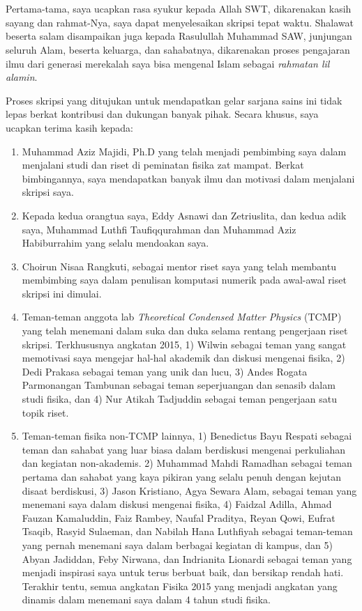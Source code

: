 \chapter*{\kataPengantar}
Pertama-tama, saya ucapkan rasa syukur kepada Allah SWT, dikarenakan kasih sayang dan rahmat-Nya, saya dapat menyelesaikan skripsi tepat waktu. Shalawat beserta salam disampaikan juga kepada Rasulullah Muhammad SAW, junjungan seluruh Alam, beserta keluarga, dan sahabatnya, dikarenakan proses pengajaran ilmu dari generasi merekalah saya bisa mengenal Islam sebagai \textit{rahmatan lil alamin}. 

Proses skripsi yang ditujukan untuk mendapatkan gelar sarjana sains ini tidak lepas berkat kontribusi dan dukungan banyak pihak. Secara khusus, saya ucapkan terima kasih kepada:
\begin{enumerate}
	\item Muhammad Aziz Majidi, Ph.D yang telah menjadi pembimbing saya dalam menjalani
	studi dan riset di peminatan fisika zat mampat. Berkat bimbingannya, saya mendapatkan
	banyak ilmu dan motivasi dalam menjalani skripsi saya.
	\item Kepada kedua orangtua saya, Eddy Asnawi dan Zetriuslita, dan kedua adik saya, Muhammad Luthfi 
	Taufiqqurahman dan Muhammad Aziz Habiburrahim yang selalu mendoakan saya.
	\item Choirun Nisaa Rangkuti, sebagai mentor riset saya yang telah membantu membimbing saya
	dalam penulisan komputasi numerik pada awal-awal riset skripsi ini dimulai. 
	\item Teman-teman anggota lab \textit{Theoretical Condensed Matter Physics} (TCMP) yang telah
	menemani dalam suka dan duka selama rentang pengerjaan riset skripsi. Terkhususnya angkatan 2015, 
	1) Wilwin sebagai teman yang sangat memotivasi saya mengejar hal-hal akademik dan diskusi mengenai fisika,
	2) Dedi Prakasa sebagai teman yang unik dan lucu, 3) Andes Rogata Parmonangan Tambunan sebagai teman seperjuangan dan senasib
	dalam studi fisika, dan 4) Nur Atikah Tadjuddin sebagai teman pengerjaan satu topik riset.
	\item Teman-teman fisika non-TCMP lainnya, 1) Benedictus Bayu Respati sebagai teman dan sahabat yang luar biasa
	dalam berdiskusi mengenai perkuliahan dan kegiatan non-akademis.	2) Muhammad Mahdi Ramadhan sebagai teman pertama dan sahabat yang kaya pikiran yang selalu penuh dengan kejutan disaat berdiskusi, 3) Jason Kristiano, Agya Sewara Alam, sebagai teman yang menemani saya dalam 	diskusi mengenai fisika, 4) Faidzal Adilla, Ahmad Fauzan Kamaluddin, Faiz Rambey, Naufal Praditya, Reyan Qowi, Eufrat Tsaqib, Rasyid Sulaeman, dan Nabilah Hana Luthfiyah sebagai teman-teman yang pernah menemani saya dalam berbagai kegiatan di kampus,	dan 5) Abyan Jadiddan, Feby Nirwana, dan Indrianita Lionardi sebagai teman yang menjadi inspirasi saya untuk terus berbuat baik, dan bersikap rendah hati. Terakhir tentu, semua angkatan Fisika 2015 yang menjadi angkatan yang dinamis dalam menemani saya dalam 4 tahun studi fisika.
\end{enumerate}
